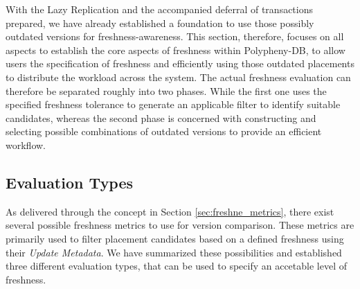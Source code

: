 With the Lazy Replication and the accompanied deferral of transactions prepared, we have already established a foundation to use those possibly outdated versions
for freshness-awareness. This section, therefore, focuses on all aspects to establish the core aspects of freshness within Polypheny-DB,
to allow users the specification of freshness and efficiently using those outdated placements to distribute the workload across the system.
The actual freshness evaluation can therefore be separated roughly into two phases. While the first one uses the specified freshness tolerance to generate an 
applicable filter to identify suitable candidates, whereas the second phase is concerned with constructing and selecting possible combinations of outdated versions
to provide an efficient workflow.



\subsection{Evaluation Types}
\label{sec:eval_types}

As delivered through the concept in Section \ref{sec:freshne_metrics}, there exist several possible freshness metrics to use for version comparison.
These metrics are primarily used to filter placement candidates based on a defined freshness using their \emph{Update Metadata}.
We have summarized these possibilities and established three different evaluation types, that can be used to specify an accetable level of freshness.


